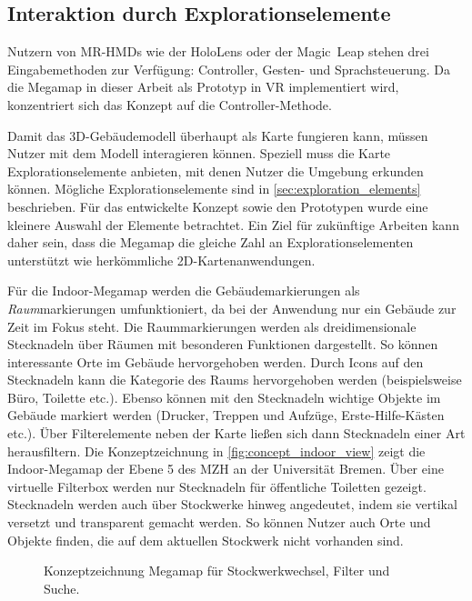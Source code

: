 \subsection{Interaktion durch Explorationselemente}
Nutzern von MR-HMDs wie der HoloLens oder der Magic~Leap stehen drei Eingabemethoden zur Verfügung: Controller, Gesten- und Sprachsteuerung.
Da die Megamap in dieser Arbeit als Prototyp in VR implementiert wird, konzentriert sich das Konzept auf die Controller-Methode.

Damit das 3D-Gebäudemodell überhaupt als Karte fungieren kann, müssen Nutzer mit dem Modell interagieren können.
Speziell muss die Karte Explorationselemente anbieten, mit denen Nutzer die Umgebung erkunden können.
Mögliche Explorationselemente sind in \autoref{sec:exploration_elements} beschrieben.
Für das entwickelte Konzept sowie den Prototypen wurde eine kleinere Auswahl der Elemente betrachtet.
Ein Ziel für zukünftige Arbeiten kann daher sein, dass die Megamap die gleiche Zahl an Explorationselementen unterstützt wie herkömmliche 2D-Kartenanwendungen.

Für die Indoor-Megamap werden die Gebäudemarkierungen als \emph{Raum}markierungen umfunktioniert, da bei der Anwendung nur ein Gebäude zur Zeit im Fokus steht.
Die Raummarkierungen werden als dreidimensionale Stecknadeln über Räumen mit besonderen Funktionen dargestellt.
So können interessante Orte im Gebäude hervorgehoben werden.
Durch Icons auf den Stecknadeln kann die Kategorie des Raums hervorgehoben werden (beispielsweise Büro, Toilette etc.).
Ebenso können mit den Stecknadeln wichtige Objekte im Gebäude markiert werden (Drucker, Treppen und Aufzüge, Erste-Hilfe-Kästen etc.).
Über Filterelemente neben der Karte ließen sich dann Stecknadeln einer Art herausfiltern.
Die Konzeptzeichnung in \autoref{fig:concept_indoor_view} zeigt die Indoor-Megamap der Ebene 5 des MZH an der Universität Bremen.
Über eine virtuelle Filterbox werden nur Stecknadeln für öffentliche Toiletten gezeigt.
Stecknadeln werden auch über Stockwerke hinweg angedeutet, indem sie vertikal versetzt und transparent gemacht werden.
So können Nutzer auch Orte und Objekte finden, die auf dem aktuellen Stockwerk nicht vorhanden sind.
\vfill
\begin{figure}[h]
	\centering
	\caption{Konzeptzeichnung Megamap für Stockwerkwechsel, Filter und Suche.}
	\label{fig:concept_indoor_view}
\end{figure}

